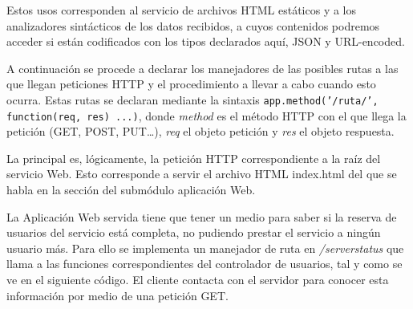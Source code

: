
Estos usos corresponden al servicio de archivos HTML estáticos y a los analizadores sintácticos de los datos recibidos, a cuyos contenidos podremos acceder si están codificados con los tipos declarados aquí, JSON y URL-encoded.

A continuación se procede a declarar los manejadores de las posibles rutas a las que llegan peticiones HTTP y el procedimiento a llevar a cabo cuando esto ocurra. Estas rutas se declaran mediante la sintaxis \texttt{app.method('/ruta/', function(req, res) {...})}, donde \emph{method} es el método HTTP con el que llega la petición (GET, POST, PUT…), \emph{req} el objeto petición y \emph{res} el objeto respuesta.


La principal es, lógicamente, la petición HTTP correspondiente a la raíz del servicio Web. Esto corresponde a servir el archivo HTML index.html del que se habla en la sección del submódulo aplicación Web.

La Aplicación Web servida tiene que tener un medio para saber si la reserva de usuarios del servicio está completa, no pudiendo prestar el servicio a ningún usuario más. Para ello se implementa un manejador de ruta en \emph{/serverstatus} que llama a las funciones correspondientes del controlador de usuarios, tal y como se ve en el siguiente código. El cliente contacta con el servidor para conocer esta información por medio de una petición GET.

